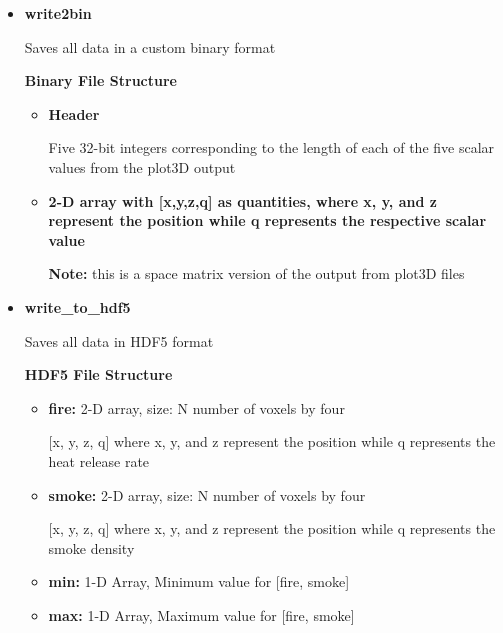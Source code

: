 \begin{itemize}
\begin{itemize}
                \end{itemize} 
    \item \textbf{write2bin}
    \item[] Saves all data in a custom binary format
            \item[] \textbf{Binary File Structure}   
                \begin{itemize}
                \item\textbf{Header}
                \item[] Five 32-bit integers corresponding to the length of each of the five scalar values from the plot3D output
                \item\textbf{ 2-D array with [x,y,z,q] as quantities, where x, y, and z represent the position while q represents the respective scalar value } 
                \item[] \textbf{Note:} this is a space matrix version of the output from plot3D files
                \end{itemize}
    \item \textbf{write\_to\_hdf5}
    \item[] Saves all data in HDF5 format
        \item[] \textbf{HDF5 File Structure}   
            \begin{itemize}
            \item\textbf{fire:} 2-D array, size: N {number of voxels}  by four
            \item[] [x, y, z, q] where x, y, and z represent the position while q represents the heat release rate
            \item\textbf{smoke:} 2-D array, size: N {number of voxels}  by four
            \item[] [x, y, z, q] where x, y, and z represent the position while q represents the smoke density
            \item\textbf{min:} 1-D Array, Minimum value for [fire, smoke]
            \item\textbf{max:} 1-D Array, Maximum value for [fire, smoke]
        \end{itemize} 
    \end{itemize}


